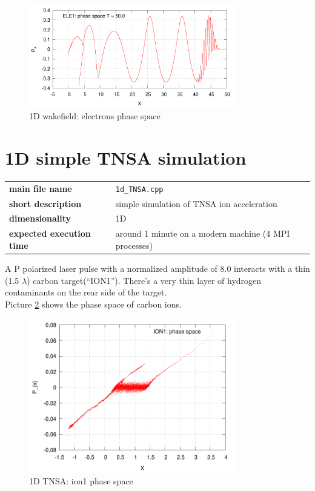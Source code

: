 \documentclass[11pt,a4paper]{report}
\begin{document}
    \begin{figure}[htbp]
    \centering
    \includegraphics[width=0.80\textwidth]{wake.png}
    \caption{1D wakefield: electrons phase space}
	\label{pic_1dwake}    
    \end{figure}    

\section{1D simple TNSA simulation}
\begin{center}
    \begin{tabular}{ l | l }
    	\textbf{main file name} & \verb+1d_TNSA.cpp+\\
    	\textbf{short description} & simple simulation of TNSA ion acceleration\\
    	\textbf{dimensionality} & 1D  \\
    	\textbf{expected execution time} & around 1 minute on a modern machine (4 MPI processes)
    \end{tabular}
    \end{center}
A P polarized laser pulse with a normalized amplitude of 8.0 interacts with a thin (1.5 $\lambda$) carbon target(``ION1''). There's a very thin layer of hydrogen contaminants on the rear side of the target.\\
Picture \ref{pic_1dTNSA} shows the phase space of carbon ions.
    
    
    \begin{figure}[htbp]
    \centering
    \includegraphics[width=0.80\textwidth]{TNSA1d.png}
    \caption{1D TNSA: ion1 phase space}
	\label{pic_1dTNSA}    
    \end{figure}    
\end{document}
